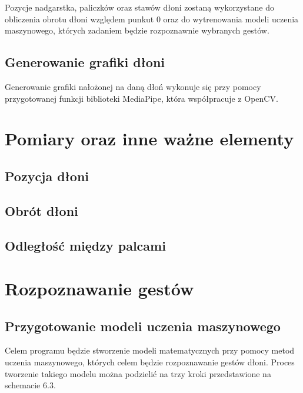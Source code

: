 \quad Pozycje nadgarstka, paliczków oraz stawów dłoni zostaną wykorzystane do obliczenia obrotu dłoni względem punkut 0 oraz do wytrenowania modeli uczenia maszynowego, których zadaniem będzie rozpoznawnie wybranych gestów. 

\subsection{Generowanie grafiki dłoni}

\quad Generowanie grafiki nałożonej na daną dłoń wykonuje się przy pomocy przygotowanej funkcji biblioteki MediaPipe, która współpracuje z OpenCV.   

\section{Pomiary oraz inne ważne elementy}

\subsection{Pozycja dłoni}

\subsection{Obrót dłoni}

\subsection{Odległość między palcami}




\section{Rozpoznawanie gestów}

\subsection{Przygotowanie modeli uczenia maszynowego}
\quad Celem programu będzie stworzenie modeli matematycznych przy pomocy metod uczenia maszynowego, których celem będzie rozpoznawanie gestów dłoni. Proces tworzenie takiego modelu można podzielić na trzy kroki przedstawione na schemacie 6.3. 

